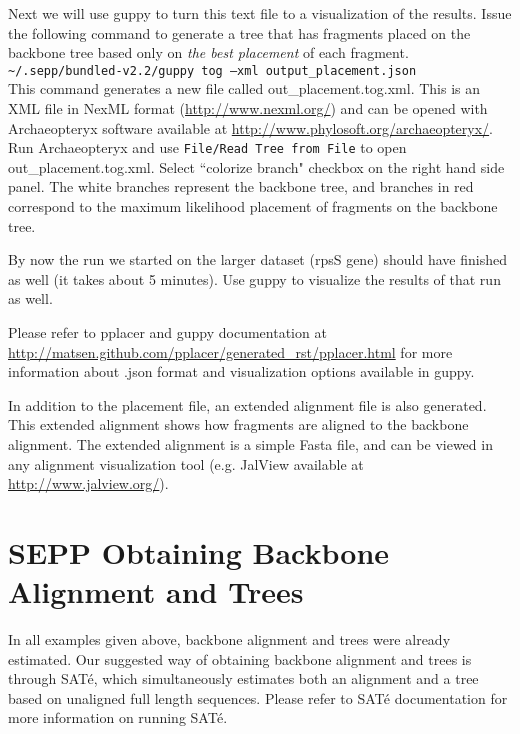 \documentclass[11pt]{article} %
\newcommand{\sepp}{SEPP\xspace}
\newcommand{\ins}[1]{{\tt #1}}
\newcommand{\file}[1]{{\sf #1}}
\newcommand{\sate}{SAT\'{e}\xspace}
\newcommand{\pplacer}{pplacer\xspace}
\newcommand{\guppy}{guppy\xspace}
\newcommand{\arch}{Archaeopteryx\xspace}
\newcommand{\sbun}{\textasciitilde/.sepp/bundled-v2.2}
\begin{document}
Next we will use \guppy to turn this text file to a visualization of the results. Issue the following command to generate a tree that has fragments placed on the backbone tree based only on {\em the best placement} of each fragment.\\

\ins{\sbun/guppy tog --xml output\_placement.json}\\

This command generates a new file called \file{out\_placement.tog.xml}. This is an XML file in NexML format (\url{http://www.nexml.org/}) and can be opened with \arch software {available at \url{http://www.phylosoft.org/archaeopteryx/}}. 
Run \arch and use \ins{File/Read Tree from File} to open \file{out\_placement.tog.xml}. Select ``colorize branch" checkbox on the right hand side panel. The white branches represent the backbone tree, and branches in red correspond to the maximum likelihood placement of fragments on the backbone tree. 

By now the run we started on the larger dataset (rpsS gene) should have finished as well (it takes about 5 minutes). Use \guppy to visualize the results of that run as well. 

Please refer to \pplacer and \guppy documentation at \url{http://matsen.github.com/pplacer/generated_rst/pplacer.html} for more information about \file{.json} format and visualization options available in \guppy. 

In addition to the placement file, an extended alignment file is also generated. This extended alignment shows how fragments are aligned to the backbone alignment. The extended alignment is a simple Fasta file, and can be viewed in any alignment visualization tool (e.g. JalView available at \url{http://www.jalview.org/}). 


\section{\sepp Obtaining Backbone Alignment and Trees}
In all examples given above, backbone alignment and trees were already estimated.
Our suggested way of obtaining backbone alignment and trees is through \sate \cite{sate2},
which simultaneously estimates both an alignment and a tree based on unaligned full length sequences.
Please refer to \sate documentation for more information on running \sate. 
\end{document}
